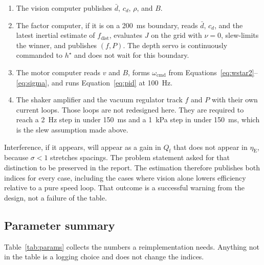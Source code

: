 \begin{enumerate}
\item The vision computer publishes $\bar d$, $c_d$, $\rho$, and $B$.
\item The factor computer, if it is on a 200~ms boundary, reads $\bar d$, $c_d$, and the latest inertial estimate of $f_{\mathrm{dist}}$, evaluates $J$ on the grid with $\nu=0$, slew-limits the winner, and publishes $(f,P)$. The depth servo is continuously commanded to $h^{\star}$ and does not wait for this boundary.
\item The motor computer reads $v$ and $B$, forms $\omega_{\mathrm{cmd}}$ from Equations~\eqref{eq:wstar2}--\eqref{eq:sigma}, and runs Equation~\eqref{eq:pid} at 100~Hz.
\item The shaker amplifier and the vacuum regulator track $f$ and $P$ with their own current loops. Those loops are not redesigned here. They are required to reach a 2~Hz step in under 150~ms and a 1~kPa step in under 150~ms, which is the slew assumption made above.
\end{enumerate}

Interference, if it appears, will appear as a gain in $Q_{\mathrm{f}}$ that does not appear in $\eta_{\mathrm{E}}$, because $\sigma<1$ stretches spacings. The problem statement asked for that distinction to be preserved in the report. The estimation therefore publishes both indices for every case, including the cases where vision alone lowers efficiency relative to a pure speed loop. That outcome is a successful warning from the design, not a failure of the table.

\subsection{Parameter summary}

Table~\ref{tab:params} collects the numbers a reimplementation needs. Anything not in the table is a logging choice and does not change the indices.

